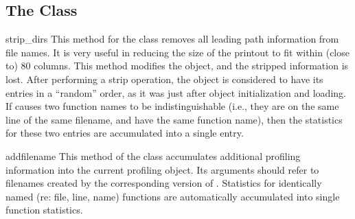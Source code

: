 \subsection{The  Class}

\renewcommand{\indexsubitem}{(Stats method)}

\begin{funcdesc}{strip_dirs}{}
This method for the  class removes all leading path information
from file names.  It is very useful in reducing the size of the
printout to fit within (close to) 80 columns.  This method modifies
the object, and the stripped information is lost.  After performing a
strip operation, the object is considered to have its entries in a
``random'' order, as it was just after object initialization and
loading.  If  causes two function names to be
indistinguishable (i.e., they are on the same line of the same
filename, and have the same function name), then the statistics for
these two entries are accumulated into a single entry.
\end{funcdesc}


\begin{funcdesc}{add}{filename}
This method of the  class accumulates additional profiling
information into the current profiling object.  Its arguments should
refer to filenames created by the corresponding version of
.  Statistics for identically named (re: file,
line, name) functions are automatically accumulated into single
function statistics.
\end{funcdesc}


